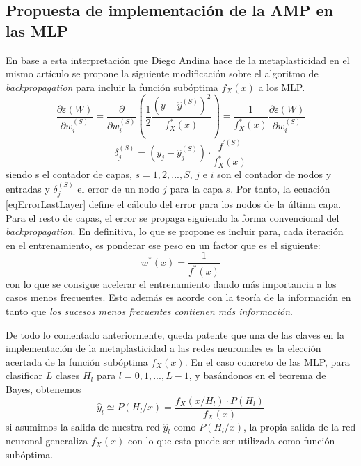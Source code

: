 \documentclass[10pt,a4paper]{report}
\begin{document}
\subsection{Propuesta de implementación de la AMP en las MLP}
En base a esta interpretación que Diego Andina hace de la metaplasticidad en el mismo artículo \citep{Andina2009} se propone la siguiente modificación sobre el algoritmo de \textit{backpropagation} para incluir la función subóptima $f_X(x)$ a los MLP. 
\begin{equation}
	\dfrac{\partial\varepsilon(W)}{\partial w^{(S)}_i} = \dfrac{\partial}{\partial w^{(S)}_i}\left(\dfrac{1}{2}\dfrac{(y-\widehat{y}^{(S)})^2}{f^*_X(x)}\right) = \dfrac{1}{f^*_X(x)}\dfrac{\partial\varepsilon(W)}{\partial w^{(S)}_i}
\end{equation} 
\begin{equation}
	\label{eqErrorLastLayer}
	\delta_j^{(S)} = (y_j - \widehat{y}^{(S)}_j) \cdot \dfrac{f^{'(S)}}{f^*_X(x)}
\end{equation}
siendo s el contador de capas, $s=1,2,...,S$, $j$ e $i$ son el contador de nodos y entradas y $\delta_j^{(S)}$ el error de un nodo $j$ para la capa $s$. Por tanto, la ecuación \ref{eqErrorLastLayer} define el cálculo del error para los nodos de la última capa. Para el resto de capas, el error se propaga siguiendo la forma convencional del \textit{backpropagation}.
En definitiva, lo que se propone es incluir para, cada iteración en el entrenamiento, es ponderar ese peso en un factor que es el siguiente:
\begin{equation}
	w^*(x) = \dfrac{1}{f^*(x)}
\end{equation}
con lo que se consigue acelerar el entrenamiento dando más importancia a los casos menos frecuentes. Esto además es acorde con la teoría de la información en tanto que \textit{los sucesos menos frecuentes contienen más información}.

De todo lo comentado anteriormente, queda patente que una de las claves en la implementación de la metaplasticidad a las redes neuronales es la elección acertada de la función subóptima $f_X(x)$. En el caso concreto de las MLP, para clasificar $L$ clases $H_l$ para $l=0,1,...,L-1$, y basándonos en el teorema de Bayes, obtenemos
\begin{equation}
	\widehat{y}_l \simeq P(H_l/x)=\dfrac{f_X(x/H_l) \cdot P(H_l)}{f_X(x)}
\end{equation}
si asumimos la salida de nuestra red $\widehat{y}_l$ como $P(H_l/x)$, la propia salida de la red neuronal generaliza $f_X(x)$ con lo que esta puede ser utilizada como función subóptima.
\end{document}
